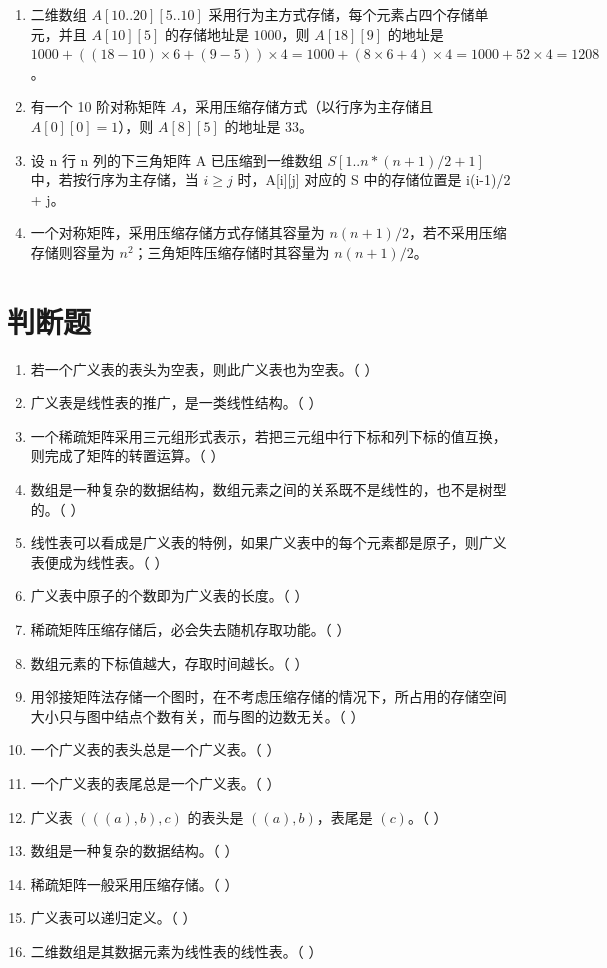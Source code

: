 \documentclass[12pt, a4paper]{article}
\begin{document}
\begin{enumerate}
	\item 二维数组 $A[10..20][5..10]$ 采用行为主方式存储，每个元素占四个存储单元，并且 $A[10][5]$ 的存储地址是 $1000$，则 $A[18][9]$ 的地址是 $1000 + ((18-10) \times 6 + (9-5)) \times 4 = 1000 + (8 \times 6 + 4) \times 4 = 1000 + 52 \times 4 = 1208$。

	\item 有一个 10 阶对称矩阵 $A$，采用压缩存储方式（以行序为主存储且 $A[0][0]=1$），则 $A[8][5]$ 的地址是 $33$。
	\item 设 n 行 n 列的下三角矩阵 A 已压缩到一维数组 $S[1..n*(n+1)/2+1]$ 中，若按行序为主存储，当 $i \ge j$ 时，A[i][j] 对应的 S 中的存储位置是 i(i-1)/2 + j。
	\item 一个对称矩阵，采用压缩存储方式存储其容量为 $n(n+1)/2$，若不采用压缩存储则容量为 $n^2$；三角矩阵压缩存储时其容量为 $n(n+1)/2$。
\end{enumerate}

\section*{判断题}

\begin{enumerate}
	\item 若一个广义表的表头为空表，则此广义表也为空表。（ ）
	\item 广义表是线性表的推广，是一类线性结构。（ ）
	\item 一个稀疏矩阵采用三元组形式表示，若把三元组中行下标和列下标的值互换，则完成了矩阵的转置运算。（ ）
	\item 数组是一种复杂的数据结构，数组元素之间的关系既不是线性的，也不是树型的。（ ）
	\item 线性表可以看成是广义表的特例，如果广义表中的每个元素都是原子，则广义表便成为线性表。（ ）
	\item 广义表中原子的个数即为广义表的长度。（ ）
	\item 稀疏矩阵压缩存储后，必会失去随机存取功能。（ ）
	\item 数组元素的下标值越大，存取时间越长。（ ）
	\item 用邻接矩阵法存储一个图时，在不考虑压缩存储的情况下，所占用的存储空间大小只与图中结点个数有关，而与图的边数无关。（ ）
	\item 一个广义表的表头总是一个广义表。（ ）
	\item 一个广义表的表尾总是一个广义表。（ ）
	\item 广义表 $(((a), b), c)$ 的表头是 $((a), b)$，表尾是 $(c)$。（ ）
	\item 数组是一种复杂的数据结构。（ ）
	\item 稀疏矩阵一般采用压缩存储。（ ）
	\item 广义表可以递归定义。（ ）
	\item 二维数组是其数据元素为线性表的线性表。（ ）
\end{enumerate}
\end{document}
